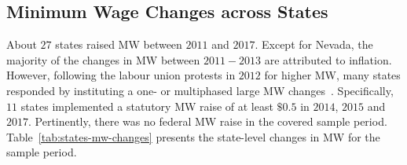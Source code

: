 \documentclass[12pt, english]{article}
\begin{document}
    \subsection{Minimum Wage Changes across States}\label{subsec:minimum-wage-changes-across-states}
    About $27$ states raised MW between $2011$ and $2017$. Except for Nevada, the majority of the changes in MW between $2011-2013$ are attributed to inflation. However, following the labour union protests in $2012$ for higher MW, many states responded by instituting a one- or multiphased large MW changes~\parencite{lathrop2021raises}. Specifically, $11$ states implemented a statutory MW raise of at least $\$0.5$ in $2014$, $2015$ and $2017$. Pertinently, there was no federal MW raise in the covered sample period. Table~\ref{tab:states-mw-changes} presents the state-level changes in MW for the sample period.
\end{document}
